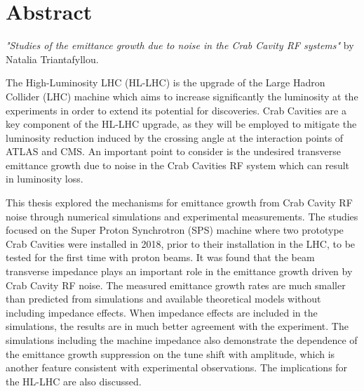 \cleardoublepage
\chapter*{Abstract}

\textit{"Studies of the emittance growth due to noise in the Crab Cavity RF systems"} by Natalia Triantafyllou.

The High-Luminosity LHC (HL-LHC) is the upgrade of the Large Hadron Collider (LHC) machine which aims to increase significantly the luminosity at the experiments in order to extend its potential for discoveries. Crab Cavities are a key component of the HL-LHC upgrade, as they will be employed to mitigate the luminosity reduction induced by the crossing angle at the interaction points of ATLAS and CMS. An important point to consider is the undesired transverse emittance growth due to noise in the Crab Cavities RF system which can result in luminosity loss. 

This thesis explored the mechanisms for emittance growth from Crab Cavity RF noise through numerical simulations and experimental measurements. The studies focused on the Super Proton Synchrotron (SPS) machine where two prototype Crab Cavities were installed in 2018, prior to their installation in the LHC, to be tested for the first time with proton beams. It was found that the beam transverse impedance plays an important role in the emittance growth driven by Crab Cavity RF noise. The measured emittance growth rates are much smaller than predicted from simulations and available theoretical models without including impedance effects. When impedance effects are included in the simulations, the results are in much better agreement with the experiment. The simulations including the machine impedance also demonstrate the dependence of the emittance growth suppression on the tune shift with amplitude, which is another feature consistent with experimental observations. The implications for the HL-LHC are also discussed.






